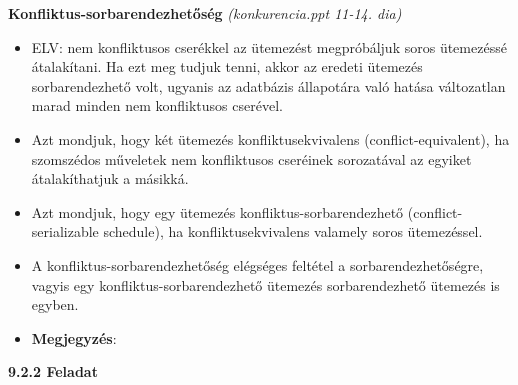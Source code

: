 \documentclass[a4paper,11.5pt, table]{article}
\begin{document}
	{\large \textbf{Konfliktus-sorbarendezhetőség}} \textit{(konkurencia.ppt 11-14. dia)}
	\begin{itemize}
		\item ELV: nem konfliktusos cserékkel az ütemezést megpróbáljuk soros ütemezéssé átalakítani. Ha ezt meg tudjuk tenni, akkor az eredeti ütemezés sorbarendezhető volt, ugyanis az adatbázis állapotára való hatása változatlan marad minden nem konfliktusos cserével.
		
		\item Azt mondjuk, hogy két ütemezés konfliktusekvivalens (conflict-equivalent), ha szomszédos műveletek nem konfliktusos cseréinek sorozatával az egyiket átalakíthatjuk a másikká. 
		
		\item Azt mondjuk, hogy egy ütemezés konfliktus-sorbarendezhető (conflict-serializable schedule), ha konfliktusekvivalens valamely soros ütemezéssel. 
		
		\item A konfliktus-sorbarendezhetőség elégséges feltétel a sorbarendezhetőségre, vagyis egy konfliktus-sorbarendezhető ütemezés sorbarendezhető ütemezés is egyben. 
		
		\item \textbf{Megjegyzés}:
	\end{itemize}

\newpage

	{\large \textbf{9.2.2 Feladat}}
	
\end{document}
